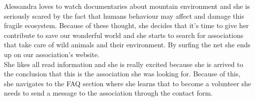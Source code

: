 Alessandra loves to watch documentaries about mountain environment and she is seriously scared by the fact that humans behaviour may affect and damage this fragile ecosystem. Because of these thought, she decides that it's time to give her contribute to save our wonderful world and she starts to search for associations that take care of wild animals and their environment. By surfing the net she ends up on our association's website. \\
She likes all read information and she is really excited because she is arrived to the conclusion that this is the association she was looking for. Because of this, she navigates to the FAQ section where she learns that to become a volunteer she needs to send a message to the association through the contact form.

	\begin{figure}[h!]
		\centering
		\begin{minipage}[b]{0.8\textwidth}

\end{minipage}
\end{figure}
